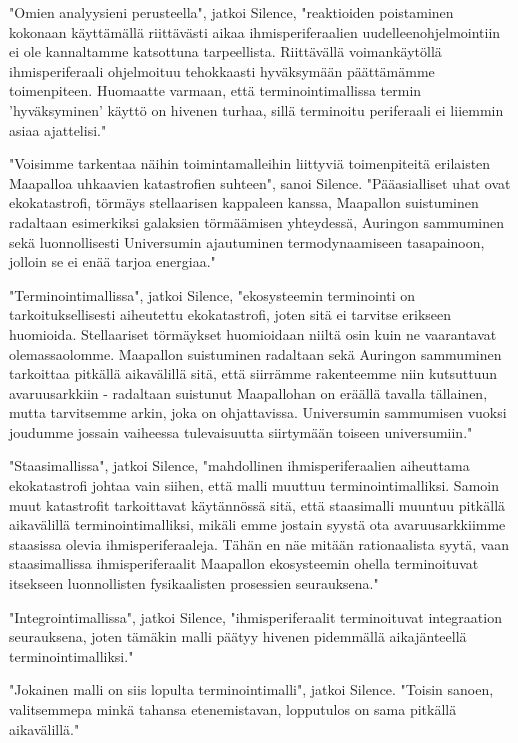 "Omien analyysieni perusteella", jatkoi Silence, "reaktioiden poistaminen kokonaan käyttämällä riittävästi aikaa ihmisperiferaalien uudelleenohjelmointiin ei ole kannaltamme katsottuna tarpeellista. Riittävällä voimankäytöllä ihmisperiferaali ohjelmoituu tehokkaasti hyväksymään päättämämme toimenpiteen. Huomaatte varmaan, että terminointimallissa termin 'hyväksyminen' käyttö on hivenen turhaa, sillä terminoitu periferaali ei liiemmin asiaa ajattelisi."




\psep "Voisimme tarkentaa näihin toimintamalleihin liittyviä toimenpiteitä erilaisten Maapalloa uhkaavien katastrofien suhteen", sanoi Silence. "Pääasialliset uhat ovat ekokatastrofi, törmäys stellaarisen kappaleen kanssa, Maapallon suistuminen radaltaan esimerkiksi galaksien törmäämisen yhteydessä, Auringon sammuminen sekä luonnollisesti Universumin ajautuminen termodynaamiseen tasapainoon, jolloin se ei enää tarjoa energiaa."


"Terminointimallissa", jatkoi Silence, "ekosysteemin terminointi on tarkoituksellisesti aiheutettu ekokatastrofi, joten sitä ei tarvitse erikseen huomioida. Stellaariset törmäykset huomioidaan niiltä osin kuin ne vaarantavat olemassaolomme. Maapallon suistuminen radaltaan sekä Auringon sammuminen tarkoittaa pitkällä aikavälillä sitä, että siirrämme rakenteemme niin kutsuttuun avaruusarkkiin - radaltaan suistunut Maapallohan on eräällä tavalla tällainen, mutta tarvitsemme arkin, joka on ohjattavissa. Universumin sammumisen vuoksi joudumme jossain vaiheessa tulevaisuutta siirtymään toiseen universumiin."


"Staasimallissa", jatkoi Silence, "mahdollinen ihmisperiferaalien aiheuttama ekokatastrofi johtaa vain siihen, että malli muuttuu terminointimalliksi. Samoin muut katastrofit tarkoittavat käytännössä sitä, että staasimalli muuntuu pitkällä aikavälillä terminointimalliksi, mikäli emme jostain syystä ota avaruusarkkiimme staasissa olevia ihmisperiferaaleja. Tähän en näe mitään rationaalista syytä, vaan staasimallissa ihmisperiferaalit Maapallon ekosysteemin ohella terminoituvat itsekseen luonnollisten fysikaalisten prosessien seurauksena."


"Integrointimallissa", jatkoi Silence, "ihmisperiferaalit terminoituvat integraation seurauksena, joten tämäkin malli päätyy hivenen pidemmällä aikajänteellä terminointimalliksi."


"Jokainen malli on siis lopulta terminointimalli", jatkoi Silence. "Toisin sanoen, valitsemmepa minkä tahansa etenemistavan, lopputulos on sama pitkällä aikavälillä."


